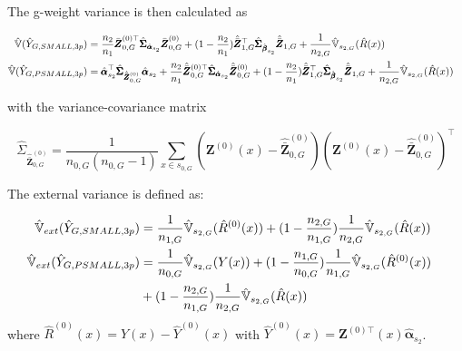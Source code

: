The g-weight variance is then calculated as

\begin{subequations}\label{eq:var_3p_small_psmall}
\begin{align}
\hat{\mathbb{V}}(\hat{Y}_{G,SMALL,3p})& =\frac{n_2}{n_1}\bar{\pmb{Z}}^{(0)\top}_{0,G}\hat{\pmb{\Sigma}}_{\hat{\pmb{\alpha}}_{s_2}}
\bar{\pmb{Z}}^{(0)}_{0,G}+(1-\frac{n_2}{n_1})\hat{\bar{\pmb{Z}}}_{1,G}^{\top}\hat{\pmb{\Sigma}}_{\hat{\pmb{\beta}}_{s_2}}
\hat{\bar{\pmb{Z}}}_{1,G} +
\frac{1}{n_{2,G}}\hat{\mathbb{V}}_{s_{2,G}}(\hat{R}(x)) \label{eq:var_3p_reg_small}&\\
\hat{\mathbb{V}}(\hat{Y}_{G,PSMALL,3p})& = \hat{\pmb{\alpha}}_{s_2}^{\top}\hat{\pmb{\Sigma}}_{\hat{\bar{\pmb{Z}}}^{(0)}_{0,G}}\hat{\pmb{\alpha}}_{s_2} +
\frac{n_2}{n_1}\hat{\bar{\pmb{Z}}}^{(0)\top}_{0,G}\hat{\pmb{\Sigma}}_{\hat{\pmb{\alpha}}_{s_2}}
\hat{\bar{\pmb{Z}}}^{(0)}_{0,G}+(1-\frac{n_2}{n_1})\hat{\bar{\pmb{Z}}}_{1,G}^{\top}\hat{\pmb{\Sigma}}_{\hat{\pmb{\beta}}_{s_2}}
\hat{\bar{\pmb{Z}}}_{1,G} + \frac{1}{n_{2,G}}\hat{\mathbb{V}}_{s_{2,G}}(\hat{R}(x)) \label{eq:var_3p_reg_psmall}
\end{align}
\end{subequations}

with the variance-covariance matrix

\begin{equation}\label{estvarcovaux3pG}
\hat{\Sigma}_{\hat{\bar{\pmb{Z}}}^{(0)}_{0,G}}=
\frac{1}{n_{0,G}(n_{0,G}-1)}\sum_{x\in{s_{0,G}}}
(\pmb{Z}^{(0)}(x)-\hat{\bar{\pmb{Z}}}^{(0)}_{0,G})(\pmb{Z}^{(0)}(x)-\hat{\bar{\pmb{Z}}}^{(0)}_{0,G})^{\top}
\end{equation}

The external variance is defined as:

\begin{subequations}\label{eq:pest_3p_small_psmall}
\begin{flalign}
\hat{\mathbb{V}}_{ext}(\hat{Y}_{G,SMALL,3p})&= \frac{1}{n_{1,G}}\hat{\mathbb{V}}_{s_{2,G}}(\hat{R}^{(0)}(x)) +
 (1-\frac{n_{2,G}}{n_{1,G}})\frac{1}{n_{2,G}}\hat{\mathbb{V}}_{s_{2,G}}(\hat{R}(x)) \label{eq:var_3p_reg_small}&\\
\hat{\mathbb{V}}_{ext}(\hat{Y}_{G,PSMALL,3p})&= \frac{1}{n_{0,G}}\hat{\mathbb{V}}_{s_{2,G}}(Y(x)) + (1-\frac{n_{1,G}}{n_{0,G}}) \frac{1}{n_{1,G}}\hat{\mathbb{V}}_{s_{2,G}}(\hat{R}^{(0)}(x)) \nonumber &\\
 &+ (1-\frac{n_{2,G}}{n_{1,G}})\frac{1}{n_{2,G}}\hat{\mathbb{V}}_{s_{2,G}}(\hat{R}(x)) \label{eq:var_3p_reg_psmall}
\end{flalign}
\end{subequations}
where $\hat{R}^{(0)}(x)=Y(x)-\hat{Y}^{(0)}(x)$ with $\hat{Y}^{(0)}(x)=\pmb{Z}^{(0)\top}(x)\hat{\pmb{\alpha}}_{s_2}$.

